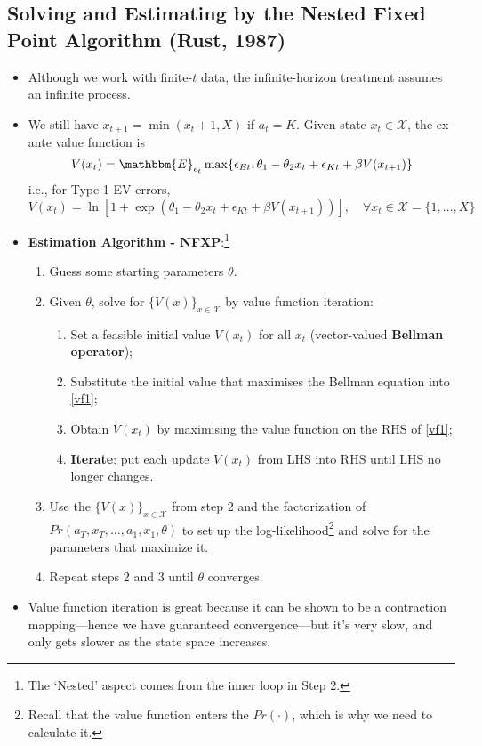 \documentclass[11pt]{article}
\begin{document}
\subsection{Solving and Estimating by the Nested Fixed Point Algorithm (Rust, 1987)}
	\begin{itemize}
		\item Although we work with finite-$t$ data, the infinite-horizon treatment assumes an infinite process.
		\item We still have $x_{t+1} = \min (x_t+1, X)$  if $a_t=K$. Given state $x_t\in \mathcal{X}$, the ex-ante value function is
		\begin{equation}
      \label{exante}
		V(x_t) = \mathbbm{E}_{\epsilon_t}\max \{\epsilon_{Et}, \theta_1 - \theta_2 x_t + \epsilon_{Kt} + \beta V(x_{t+1}) \}
		\end{equation}
		i.e., for Type-1 EV errors,
		\begin{equation}\label{vf1}
			V(x_t)=\ln [1+\exp (\theta_1 - \theta_2 x_t + \epsilon_{Kt} + \beta V(x_{t+1}))], \quad\forall x_t\in \mathcal{X}= \{1,\dots,X\}
		\end{equation}
		\item \textbf{Estimation Algorithm - NFXP}:\footnote{The `Nested' aspect comes from the inner loop in Step 2.}
		\begin{enumerate}
			\item Guess some starting parameters $\theta$.
			\item Given $\theta$, solve for $\{V(x)\}_{x\in \mathcal{X}}$ by value function iteration:
      		\begin{enumerate}
      			\item Set a feasible initial value $V(x_t)$ for all $x_t$ (vector-valued \textbf{Bellman operator});
      			\item Substitute the initial value that maximises the Bellman equation into \eqref{vf1};
            \item Obtain $V(x_t)$ by maximising the value function on the RHS of \eqref{vf1};
      			\item \textbf{Iterate}: put each update $V(x_t)$ from LHS into RHS until LHS no longer changes.
      		\end{enumerate}
			\item Use the $\{V(x)\}_{x\in \mathcal{X}}$ from step 2 and the factorization of $Pr(a_T, x_T,\dots,a_1,x_1,\theta)$ to set up the log-likelihood\footnote{Recall that the value function enters the $Pr(\cdot)$, which is why we need to calculate it.} and solve for the parameters that maximize it.
			\item Repeat steps 2 and 3 until $\theta$ converges.
		\end{enumerate}
		\item Value function iteration is great because it can be shown to be a contraction mapping---hence we have guaranteed convergence---but it's very slow, and only gets slower as the state space increases.
	\end{itemize}
\end{document}
